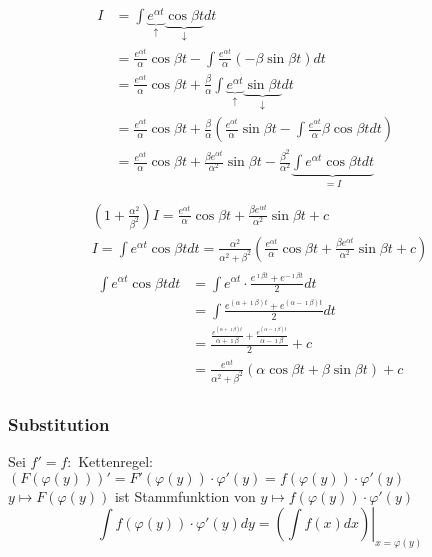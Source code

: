 \begin{bsp*}
	\begin{gather*}
		\begin{split}
			I	&= \int \underbrace{e^{\alpha t}}_{\uparrow} \underbrace{\cos \beta t}_{\downarrow} dt \\
				&= \frac{e^{\alpha t}}{\alpha} \cos \beta t - \int \frac{e^{\alpha t}}{\alpha} (-\beta \sin \beta t) dt \\
				&= \frac{e^{\alpha t}}{\alpha} \cos \beta t + \frac{\beta}{\alpha} \int \underbrace{e^{\alpha t}}_{\uparrow} \underbrace{\sin \beta t}_{\downarrow} dt \\
				&= \frac{e^{\alpha t}}{\alpha} \cos \beta t + \frac{\beta}{\alpha} \left( \frac{e^{\alpha t}}{\alpha} \sin \beta t - \int \frac{e^{\alpha t}}{\alpha} \beta \cos \beta t dt \right) \\
				&= \frac{e^{\alpha t}}{\alpha} \cos \beta t + \frac{\beta e^{\alpha t}}{\alpha^2} \sin \beta t - \frac{\beta^2}{\alpha^2} \underbrace{\int e^{\alpha t} \cos \beta t dt}_{=I} \\
		\end{split}\\
	\left(1 + \frac{\alpha^2}{\beta^2} \right) I = \frac{e^{\alpha t}}{\alpha} \cos \beta t + \frac{\beta e^{\alpha t}}{\alpha^2} \sin \beta t + c \\
		I = \int e^{\alpha t} \cos \beta t dt = \frac{\alpha^2}{\alpha^2 + \beta^2} \left( \frac{e^{\alpha t}}{\alpha} \cos \beta t + \frac{\beta e^{\alpha t}}{\alpha^2} \sin \beta t + c \right) \\
		\begin{split}
			\int e^{\alpha t} \cos \beta t dt	&= \int e^{\alpha t} \cdot \frac{e^{\imath \beta t} + e^{-\imath \beta t}}{2} dt \\
									&= \int \frac{e^{(\alpha + \imath \beta) t} + e^{(\alpha -\imath \beta) t}}{2} dt \\
									&= \frac{\frac{e^{(\alpha + \imath \beta) t}}{\alpha + \imath \beta} + \frac{e^{(\alpha - \imath \beta) t}}{\alpha - \imath \beta}}{2} + c \\
									&= \frac{e^{\alpha t}}{\alpha^2 + \beta^2} (\alpha \cos \beta t + \beta \sin \beta t) + c
		\end{split}
	\end{gather*}
\end{bsp*}

\subsubsection{Substitution}
Sei $f' = f:$ Kettenregel: $(F(\varphi(y)))' = F'(\varphi(y)) \cdot \varphi'(y) = f(\varphi(y)) \cdot \varphi'(y)$ \\
$y \mapsto F(\varphi(y))$ ist Stammfunktion von $y \mapsto f(\varphi(y)) \cdot \varphi'(y)$
\[ \int f(\varphi(y)) \cdot \varphi'(y) dy = \left. \left( \int f(x) dx \right) \right|_{x=\varphi(y)} \]

